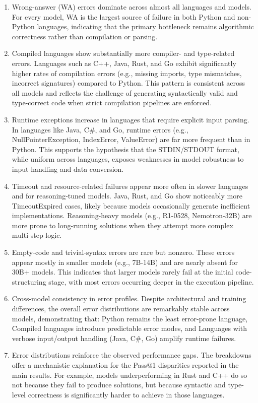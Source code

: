 \begin{enumerate}
    \item Wrong-answer (WA) errors dominate across almost all languages and models. For every model, WA is the largest source of failure in both Python and non-Python languages, indicating that the primary bottleneck remains algorithmic correctness rather than compilation or parsing.
\item Compiled languages show substantially more compiler- and type-related errors. Languages such as C++, Java, Rust, and Go exhibit significantly higher rates of compilation errors (e.g., missing imports, type mismatches, incorrect signatures) compared to Python.
This pattern is consistent across all models and reflects the challenge of generating syntactically valid and type-correct code when strict compilation pipelines are enforced.
\item Runtime exceptions increase in languages that require explicit input parsing. In languages like Java, C\#, and Go, runtime errors (e.g., NullPointerException, IndexError, ValueError) are far more frequent than in Python. This supports the hypothesis that the STDIN/STDOUT format, while uniform across languages, exposes weaknesses in model robustness to input handling and data conversion.
\item Timeout and resource-related failures appear more often in slower languages and for reasoning-tuned models.
Java, Rust, and Go show noticeably more TimeoutExpired cases, likely because models occasionally generate inefficient implementations. Reasoning-heavy models (e.g., R1-0528, Nemotron-32B) are more prone to long-running solutions when they attempt more complex multi-step logic.
\item Empty-code and trivial-syntax errors are rare but nonzero. These errors appear mostly in smaller models (e.g., 7B-14B) and are nearly absent for 30B+ models.
This indicates that larger models rarely fail at the initial code-structuring stage, with most errors occurring deeper in the execution pipeline.
\item  Cross-model consistency in error profiles. Despite architectural and training differences, the overall error distributions are remarkably stable across models, demonstrating that: Python remains the least error-prone language, Compiled languages introduce predictable error modes, and Languages with verbose input/output handling (Java, C\#, Go) amplify runtime failures.

\item Error distributions reinforce the observed performance gaps. The breakdowns offer a mechanistic explanation for the Pass@1 disparities reported in the main results. For example, models underperforming in Rust and C++ do so not because they fail to produce solutions, but because syntactic and type-level correctness is significantly harder to achieve in those languages.
\end{enumerate} 


